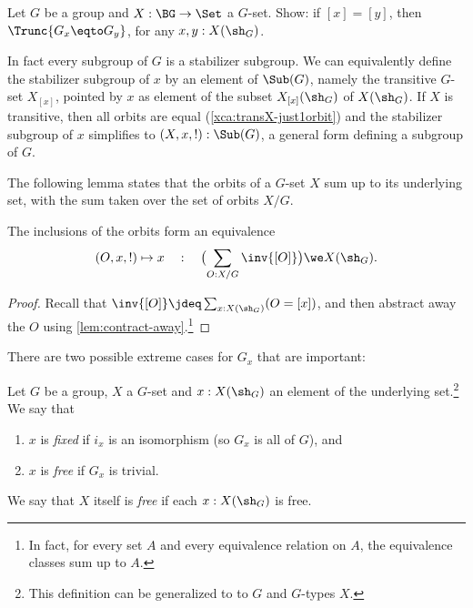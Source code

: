 \begin{xca}\label{xca:[x]=[y]-implies-||Gx=Gy||}
Let $G$ be a group and $X: \BG\to\Set$ a $G$-set. Show:
if $[x]=[y]$, then $\Trunc{G_x\eqto G_y}$, for any $x,y:X(\sh_G)$.
\end{xca}

\begin{remark}\label{rem:subgrp-is-stabsubgr}
  In fact every subgroup of $G$ is a stabilizer subgroup.
  We can equivalently define the stabilizer subgroup of $x$ 
  by an element of $\Sub(G)$, namely
  the transitive $G$-set $X_{[x]}$, pointed by
  $x$ as element of the subset $X_{[x]}(\sh_G)$ of $X(\sh_G)$.
  If $X$ is transitive, then all orbits are equal (\cref{xca:transX-just1orbit})
  and the stabilizer subgroup of $x$ simplifies to $(X,x,!):\Sub(G)$,
  a general form defining a subgroup of $G$.
\end{remark}

The following lemma states that the orbits of a $G$-set $X$
sum up to its underlying set, with the sum taken over the set
of orbits $X/G$.

\begin{lemma}
  \label{lem:splitting into orbits}
  The inclusions of the orbits form an equivalence
\[
  (O,x,!)\mapsto x \quad:\quad
  \bigl(\sum_{O:X/G} \inv{[O]} \bigr) \we X(\sh_G).
\]
\end{lemma}
\begin{proof}
Recall that $\inv{[O]}\jdeq \sum_{x:X(\sh_G)}(O=[x])$, 
and then abstract
away the $O$ using \cref{lem:contract-away}.\footnote{%
In fact, for every set $A$ and every equivalence relation on $A$,
the equivalence classes sum up to $A$.}
\end{proof}

There are two possible extreme cases for $G_x$ that are important:
\begin{definition}\label{def:fixed-free}
  Let $G$ be a group, $X$ a $G$-set and $x:X(\sh_G)$ an element of the underlying set.\footnote{%
  This definition can be generalized to to \inftygps $G$ and $G$-types $X$.}
  We say that
  \begin{enumerate}
  \item $x$ is \emph{fixed}
    if $i_x$ is an isomorphism (so $G_x$ is all of $G$), and
  \item $x$ is \emph{free}
    if $G_x$ is trivial.
  \end{enumerate}
  We say that $X$ itself is \emph{free} if each $x:X(\sh_G)$ is free.
\end{definition}

